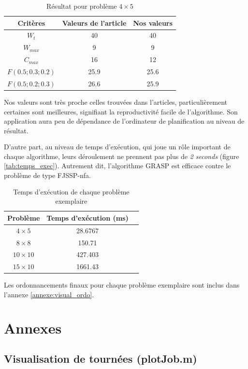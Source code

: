 \documentclass[10pt,a4paper]{scrartcl}
\begin{document}
\begin{table}[!h]
  \centering
  \begin{tabular}{|c|c|c|}
    \hline
    Critères & Valeurs de l'article & Nos valeurs \\
    \hline
    $W_t$ & 40 & 40 \\
    $W_{max}$ & 9 & 9 \\
    $C_{max}$ & 16 & 12 \\
    $F(0.5;0.3;0.2)$ & 25.9 & 25.6 \\
    $F(0.5;0.2;0.3)$ & 26.6 & 25.9 \\
    \hline
  \end{tabular}
  \caption{Résultat pour problème $4 \times 5$}
\end{table}

Nos valeurs sont très proche celles trouvées dans l'articles, particulièrement certaines sont meilleures, signifiant la reproductivité facile de l'algorithme. Son application aura peu de dépendance de l'ordinateur de planification au niveau de résultat.

D'autre part, au niveau de temps d'exécution, qui joue un rôle important de chaque algorithme, leurs déroulement ne prennent pas plus de \emph{2 seconds} (figure \eqref{tab:temps_exec}). Autrement dit, l'algorithme GRASP est efficace contre le problème de type FJSSP-nfa.

\begin{table}[!h]
  \centering
  \begin{tabular}{|c|c|c|}
    \hline
    Problème & Temps d'exécution (ms) \\
    \hline
    $4 \times 5$ & 28.6767 \\
    $8 \times 8$ & 150.71 \\
    $10 \times 10$ & 427.403 \\
    $15 \times 10$ & 1661.43 \\
    \hline
  \end{tabular}
  \caption{Temps d'exécution de chaque problème exemplaire}
  \label{tab:temps_exec}
\end{table}

Les ordonnancements finaux pour chaque problème exemplaire sont inclus dans l'annexe \eqref{annexe:visual_ordo}.

\section{Annexes}

\subsection{Visualisation de tournées (plotJob.m)}

\end{document}
